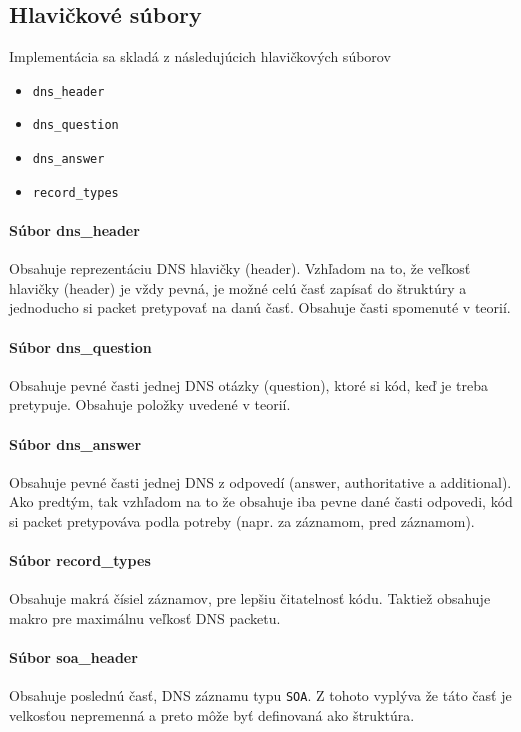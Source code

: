 \documentclass[titlepage]{article}
\begin{document}
\subsection{Hlavičkové súbory}
Implementácia sa skladá z následujúcich hlavičkových súborov
\begin{itemize}
    \item \verb|dns_header|
    \item \verb|dns_question|
    \item \verb|dns_answer|
    \item \verb|record_types|
\end{itemize}

\paragraph{Súbor dns\_header}
Obsahuje reprezentáciu DNS hlavičky (header). Vzhľadom na to, že veľkosť hlavičky (header) je vždy pevná, je možné 
celú časť zapísať do štruktúry a jednoducho si packet pretypovať na danú časť. Obsahuje časti spomenuté v teorií.

\paragraph{Súbor dns\_question}
Obsahuje pevné časti jednej DNS otázky (question), ktoré si kód, keď je treba pretypuje. Obsahuje položky uvedené v teorií.

\paragraph{Súbor dns\_answer}
Obsahuje pevné časti jednej DNS z odpovedí (answer, authoritative a additional). Ako predtým, tak vzhľadom na to že obsahuje iba
pevne dané časti odpovedi, kód si packet pretypováva podla potreby (napr. za záznamom, pred záznamom).

\paragraph{Súbor record\_types}
Obsahuje makrá čísiel záznamov, pre lepšiu čitatelnosť kódu. Taktiež obsahuje makro pre maximálnu veľkosť DNS packetu.

\paragraph{Súbor soa\_header}
Obsahuje poslednú časť, DNS záznamu typu \verb|SOA|. Z tohoto vyplýva že táto časť je velkosťou nepremenná a preto môže
byť definovaná ako štruktúra.
\end{document}

